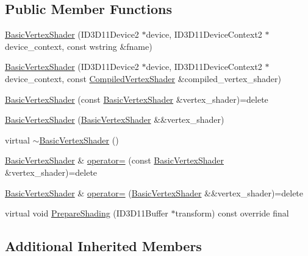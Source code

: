 \subsection*{Public Member Functions}
\begin{DoxyCompactItemize}
\item 
\hyperlink{classmage_1_1_basic_vertex_shader_a906db88dc79cfc9c3f0898d14f54065d}{Basic\+Vertex\+Shader} (I\+D3\+D11\+Device2 $\ast$device, I\+D3\+D11\+Device\+Context2 $\ast$device\+\_\+context, const wstring \&fname)
\item 
\hyperlink{classmage_1_1_basic_vertex_shader_a9cd9b21663a009c1ca37c35ab6ac7298}{Basic\+Vertex\+Shader} (I\+D3\+D11\+Device2 $\ast$device, I\+D3\+D11\+Device\+Context2 $\ast$device\+\_\+context, const \hyperlink{structmage_1_1_compiled_vertex_shader}{Compiled\+Vertex\+Shader} \&compiled\+\_\+vertex\+\_\+shader)
\item 
\hyperlink{classmage_1_1_basic_vertex_shader_ab547bf423545c41882a691ff3ebb32ce}{Basic\+Vertex\+Shader} (const \hyperlink{classmage_1_1_basic_vertex_shader}{Basic\+Vertex\+Shader} \&vertex\+\_\+shader)=delete
\item 
\hyperlink{classmage_1_1_basic_vertex_shader_a1c5f899e5dfaf81609e8e8fd73103ab2}{Basic\+Vertex\+Shader} (\hyperlink{classmage_1_1_basic_vertex_shader}{Basic\+Vertex\+Shader} \&\&vertex\+\_\+shader)
\item 
virtual \hyperlink{classmage_1_1_basic_vertex_shader_ad155c4135f5517667020ec519a3597c9}{$\sim$\+Basic\+Vertex\+Shader} ()
\item 
\hyperlink{classmage_1_1_basic_vertex_shader}{Basic\+Vertex\+Shader} \& \hyperlink{classmage_1_1_basic_vertex_shader_ab3d355e76715b24e21fb37c239d41932}{operator=} (const \hyperlink{classmage_1_1_basic_vertex_shader}{Basic\+Vertex\+Shader} \&vertex\+\_\+shader)=delete
\item 
\hyperlink{classmage_1_1_basic_vertex_shader}{Basic\+Vertex\+Shader} \& \hyperlink{classmage_1_1_basic_vertex_shader_ae5442c36b5f913ac6644cc2945a8c20a}{operator=} (\hyperlink{classmage_1_1_basic_vertex_shader}{Basic\+Vertex\+Shader} \&\&vertex\+\_\+shader)=delete
\item 
virtual void \hyperlink{classmage_1_1_basic_vertex_shader_ae565cb19b96591d5d1ff36ac0ff7344c}{Prepare\+Shading} (I\+D3\+D11\+Buffer $\ast$transform) const override final
\end{DoxyCompactItemize}
\subsection*{Additional Inherited Members}



